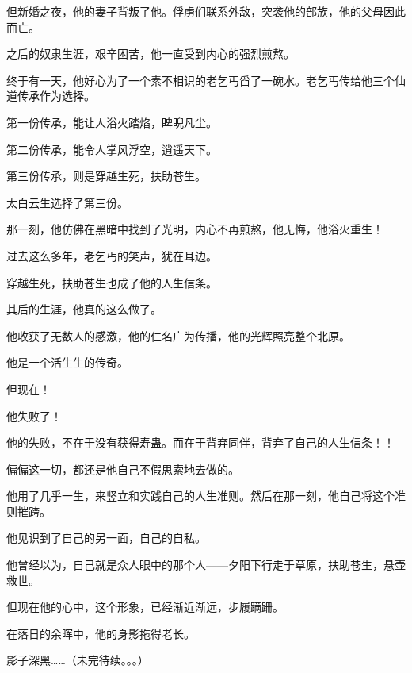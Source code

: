\begin{this_body}
但新婚之夜，他的妻子背叛了他。俘虏们联系外敌，突袭他的部族，他的父母因此而亡。

之后的奴隶生涯，艰辛困苦，他一直受到内心的强烈煎熬。

终于有一天，他好心为了一个素不相识的老乞丐舀了一碗水。老乞丐传给他三个仙道传承作为选择。

第一份传承，能让人浴火踏焰，睥睨凡尘。

第二份传承，能令人掌风浮空，逍遥天下。

第三份传承，则是穿越生死，扶助苍生。

太白云生选择了第三份。

那一刻，他仿佛在黑暗中找到了光明，内心不再煎熬，他无悔，他浴火重生！

过去这么多年，老乞丐的笑声，犹在耳边。

穿越生死，扶助苍生也成了他的人生信条。

其后的生涯，他真的这么做了。

他收获了无数人的感激，他的仁名广为传播，他的光辉照亮整个北原。

他是一个活生生的传奇。

但现在！

他失败了！

他的失败，不在于没有获得寿蛊。而在于背弃同伴，背弃了自己的人生信条！！

偏偏这一切，都还是他自己不假思索地去做的。

他用了几乎一生，来竖立和实践自己的人生准则。然后在那一刻，他自己将这个准则摧跨。

他见识到了自己的另一面，自己的自私。

他曾经以为，自己就是众人眼中的那个人——夕阳下行走于草原，扶助苍生，悬壶救世。

但现在他的心中，这个形象，已经渐近渐远，步履蹒跚。

在落日的余晖中，他的身影拖得老长。

影子深黑……（未完待续。。。）

\end{this_body}

